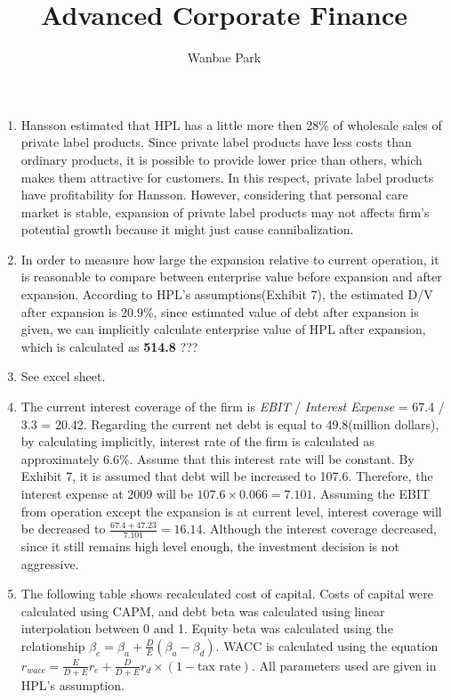 \documentclass{article}
\author{Wanbae Park}
\date{}
\title{\textbf{Advanced Corporate Finance}}
\begin{document}
\maketitle
\begin{enumerate}
	\item
	Hansson estimated that HPL has a little more then 28\% of wholesale sales of private label products. Since private label products have less costs than ordinary products, it is possible to provide lower price than others, which makes them attractive for customers. In this respect, private label products have profitability for Hansson. However, considering that personal care market is stable, expansion of private label products may not affects firm's potential growth because it might just cause cannibalization.
	\item
	In order to measure how large the expansion relative to current operation, it is reasonable to compare between enterprise value before expansion and after expansion. According to HPL's assumptions(Exhibit 7), the estimated D/V after expansion is 20.9\%, since estimated value of debt after expansion is given, we can implicitly calculate enterprise value of HPL after expansion, which is calculated as \textbf{514.8} ??? 
	\item
	See excel sheet.
	\item
	The current interest coverage of the firm is \textit{EBIT} / \textit{Interest Expense} = 67.4 / 3.3 = 20.42. Regarding the current net debt is equal to 49.8(million dollars), by calculating implicitly, interest rate of the firm is calculated as approximately 6.6\%. Assume that this interest rate will be constant. By Exhibit 7, it is assumed that debt will be increased to 107.6. Therefore, the interest expense at 2009 will be $107.6 \times 0.066 = 7.101$. Assuming the EBIT from operation except the expansion is at current level, interest coverage will be decreased to $\frac{67.4 + 47.23}{7.101} = 16.14$. Although the interest coverage decreased, since it still remains high level enough, the investment decision is not aggressive.
	\item
	The following table shows recalculated cost of capital. Costs of capital were calculated using CAPM, and debt beta was calculated using linear interpolation between 0 and 1. Equity beta was calculated using the relationship $\beta_e = \beta_a + \frac{D}{E}(\beta_a - \beta_d)$. WACC is calculated using the equation $r_{wacc} = \frac{E}{D + E} r_e + \frac{D}{D + E} r_d \times (1 - \text{tax rate})$. All parameters used are given in HPL's assumption. 

\end{enumerate}
\end{document}
